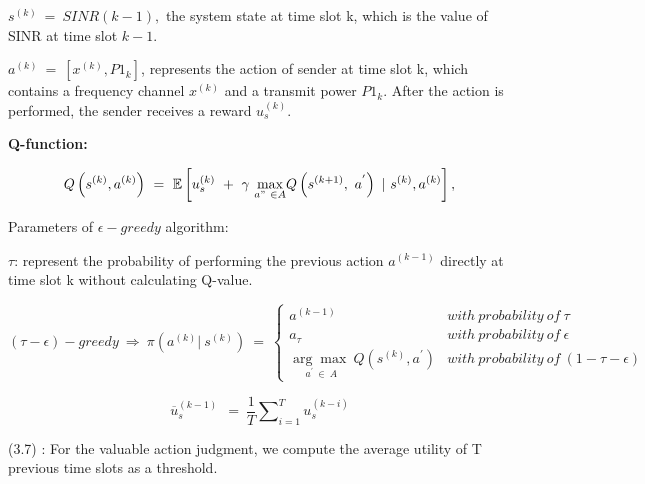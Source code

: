 \documentclass[letterpaper%
, oneside%
, 12pt%
,thesepararticles%
, english%
,creativecommons,hyperref, withAlgo2e%
]{thETS}
\begin{document}
$\displaystyle s^{( k)} \ =\ SINR( k-1) ,$ the system state at time slot k, which is the value of SINR at time slot $\displaystyle k-1$.

$\displaystyle a^{( k)} \ =\ \left[ x^{( k)} ,P1_{k}\right]$, represents the action of sender at time slot k, which contains a frequency channel $\displaystyle x^{( k)}$ and a transmit power $\displaystyle P1_{k}$. After the action is performed, the sender receives a reward $\displaystyle u_{s}^{( k)}$.

\textbf{Q-function:}

\begin{equation}
Q\left( s^{( k)} ,a^{( k)}\right) \ =\ \mathbb{E}\left[ u_{s}^{( k)} \ +\ \gamma \ \underset{a"\ \in A}{\max} Q\left( s^{( k+1)} ,\ a^{'}\right) \ |\ s^{( k)} ,a^{( k)}\right] ,
\end{equation}

Parameters of $\displaystyle \epsilon -greedy$ algorithm: 

$\displaystyle \tau $: represent the probability of performing the previous action $\displaystyle a^{( k-1)}$ directly at time slot k without calculating Q-value.

\begin{equation}
( \tau -\epsilon ) -greedy\ \Longrightarrow \ \pi \left( a^{( k)} |\ s^{( k)}\right) \ =\ \begin{cases}
a^{( k-1)} & with\ probability\ of\ \tau \\
a_{\tau } & with\ probability\ of\ \epsilon \\
\underset{a^{'} \ \in \ A}{\arg\max \ } Q\left( s^{( k)} ,a^{'}\right) & with\ probability\ of\ ( 1-\tau -\epsilon )
\end{cases}
\end{equation}


\begin{equation}
\overline{u}_{s}^{( k-1)} \ \ =\ \frac{1}{T}\sum\nolimits _{i=1}^{T} u_{s}^{( k-i)}
\end{equation}

(3.7) : For the valuable action judgment, we compute the average utility of T previous time slots as a threshold.
\end{document}

